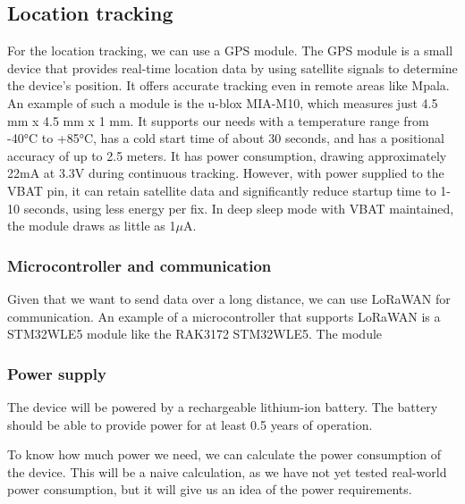 
\subsection{Location tracking}
For the location tracking, we can use a GPS module. The GPS module is a small device that provides real-time location data by using satellite signals to determine the device's position. It offers accurate tracking even in remote areas like Mpala. An example of such a module is the u-blox MIA-M10, which measures just 4.5 mm x 4.5 mm x 1 mm. It supports our needs with a temperature range from -40°C to +85°C, has a cold start time of about 30 seconds, and has a positional accuracy of up to 2.5 meters. It has power consumption, drawing approximately 22mA at 3.3V during continuous tracking. However, with power supplied to the VBAT pin, it can retain satellite data and significantly reduce startup time to 1-10 seconds, using less energy per fix. In deep sleep mode with VBAT maintained, the module draws as little as 1$\mu$A.

\subsubsection{Microcontroller and communication}
Given that we want to send data over a long distance, we can use LoRaWAN for communication. An example of a microcontroller that supports LoRaWAN is a STM32WLE5 module like the RAK3172 STM32WLE5. The module %


\subsubsection{Power supply}
The device will be powered by a rechargeable lithium-ion battery. The battery should be able to provide power for at least 0.5 years of operation. 

To know how much power we need, we can calculate the power consumption of the device. This will be a naive calculation, as we have not yet tested real-world power consumption, but it will give us an idea of the power requirements.

